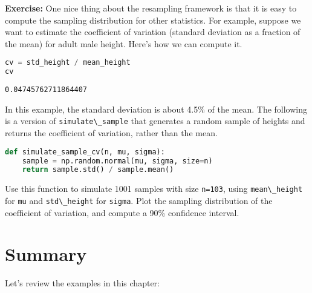 \textbf{Exercise:} One nice thing about the resampling framework is that
it is easy to compute the sampling distribution for other statistics.
For example, suppose we want to estimate the coefficient of variation
(standard deviation as a fraction of the mean) for adult male height.
Here's how we can compute it.

\begin{lstlisting}[language=Python,style=source]
cv = std_height / mean_height
cv
\end{lstlisting}

\begin{lstlisting}[style=output]
0.04745762711864407
\end{lstlisting}

In this example, the standard deviation is about 4.5\% of the mean. The
following is a version of \passthrough{\lstinline!simulate\_sample!}
that generates a random sample of heights and returns the coefficient of
variation, rather than the mean.

\begin{lstlisting}[language=Python,style=source]
def simulate_sample_cv(n, mu, sigma):
    sample = np.random.normal(mu, sigma, size=n)
    return sample.std() / sample.mean()
\end{lstlisting}

Use this function to simulate 1001 samples with size
\passthrough{\lstinline!n=103!}, using
\passthrough{\lstinline!mean\_height!} for \passthrough{\lstinline!mu!}
and \passthrough{\lstinline!std\_height!} for
\passthrough{\lstinline!sigma!}. Plot the sampling distribution of the
coefficient of variation, and compute a 90\% confidence interval.

\section{Summary}\label{summary}

Let's review the examples in this chapter:

